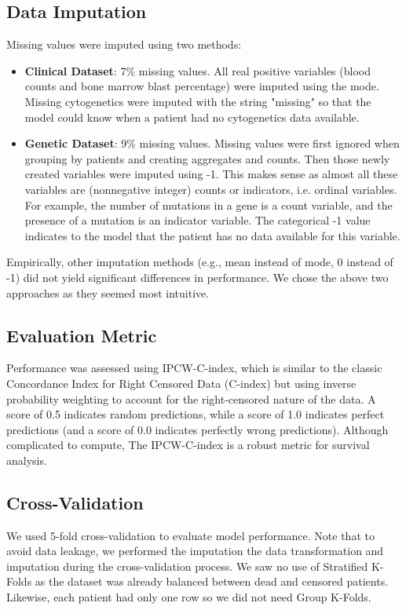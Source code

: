 \documentclass{article}
\begin{document}
\subsection{Data Imputation}
Missing values were imputed using two methods:
\begin{itemize}
    \item \textbf{Clinical Dataset}: 7\% missing values. All real positive variables (blood counts and bone marrow blast percentage) were imputed using the mode. Missing cytogenetics were imputed with the string "missing" so that the model could know when a patient had no cytogenetics data available.
    \item \textbf{Genetic Dataset}: 9\% missing values. Missing values were first ignored when grouping by patients and creating aggregates and counts. Then those newly created variables were imputed using -1. This makes sense as almost all these variables are (nonnegative integer) counts or indicators, i.e. ordinal variables. For example, the number of mutations in a gene is a count variable, and the presence of a mutation is an indicator variable. The categorical -1 value indicates to the model that the patient has no data available for this variable.
\end{itemize}

Empirically, other imputation methods (e.g., mean instead of mode, 0 instead of -1) did not yield significant differences in performance. We chose the above two approaches as they seemed most intuitive.

\subsection{Evaluation Metric}
Performance was assessed using IPCW-C-index, which is similar to the classic Concordance Index for Right Censored Data (C-index) but using inverse probability weighting to account for the right-censored nature of the data. A score of 0.5 indicates random predictions, while a score of 1.0 indicates perfect predictions (and a score of 0.0 indicates perfectly wrong predictions). Although complicated to compute, The IPCW-C-index is a robust metric for survival analysis.

\subsection{Cross-Validation}
We used 5-fold cross-validation to evaluate model performance. Note that to avoid data leakage, we performed the imputation the data transformation and imputation during the cross-validation process. We saw no use of Stratified K-Folds as the dataset was already balanced between dead and censored patients. Likewise, each patient had only one row so we did not need Group K-Folds.
\end{document}
